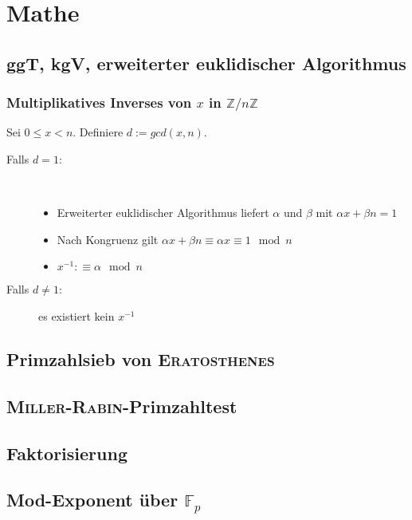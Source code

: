 \section{Mathe}

\subsection{ggT, kgV, erweiterter euklidischer Algorithmus}



\subsubsection{Multiplikatives Inverses von $x$ in $\mathbb{Z}/n\mathbb{Z}$}
Sei $0 \leq x < n$. Definiere $d := gcd(x, n)$.
\begin{description}
	\item[Falls $d = 1$:] ~
	\begin{itemize}[nosep]
		\item Erweiterter euklidischer Algorithmus liefert $\alpha$ und $\beta$ mit $\alpha x + \beta n = 1$
		\item Nach Kongruenz gilt $\alpha x + \beta n \equiv \alpha x \equiv 1 \mod n$
		\item $x^{-1} :\equiv \alpha \mod n$
	\end{itemize}
	\item[Falls $d \neq 1$:] es existiert kein $x^{-1}$
\end{description}


\subsection{Primzahlsieb von \textsc{Eratosthenes}}


\subsection{\textsc{Miller}-\textsc{Rabin}-Primzahltest}


\subsection{Faktorisierung}


\subsection{Mod-Exponent über $\mathbb{F}_p$}


